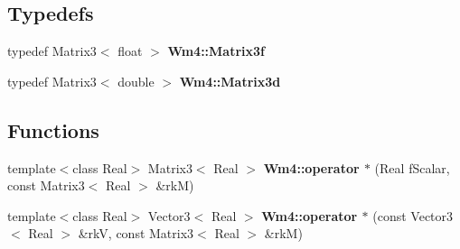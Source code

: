\subsection*{Typedefs}
\begin{CompactItemize}
\item 
typedef Matrix3$<$ float $>$ {\bf Wm4::Matrix3f}
\item 
typedef Matrix3$<$ double $>$ {\bf Wm4::Matrix3d}
\end{CompactItemize}
\subsection*{Functions}
\begin{CompactItemize}
\item 
template$<$class Real$>$ Matrix3$<$ Real $>$ {\bf Wm4::operator $\ast$} (Real f\-Scalar, const Matrix3$<$ Real $>$ \&rk\-M)
\item 
template$<$class Real$>$ Vector3$<$ Real $>$ {\bf Wm4::operator $\ast$} (const Vector3$<$ Real $>$ \&rk\-V, const Matrix3$<$ Real $>$ \&rk\-M)
\end{CompactItemize}
